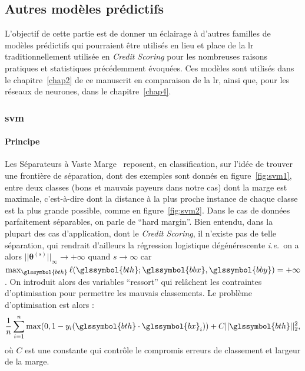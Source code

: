 \subsection{Autres modèles prédictifs}

L'objectif de cette partie est de donner un éclairage à d'autres familles de modèles prédictifs qui pourraient être utilisés en lieu et place de la \gls{lr} traditionnellement utilisée en \textit{Credit Scoring} pour les nombreuses raisons pratiques et statistiques précédemment évoquées. Ces modèles sont utilisés dans le chapitre~\ref{chap2} de ce manuscrit en comparaison de la \gls{lr}, ainsi que, pour les réseaux de neurones, dans le chapitre~\ref{chap4}.

\subsubsection{\Gls{svm}}

\paragraph{Principe}


Les Séparateurs à Vaste Marge~\cite{vapnik2013nature} reposent, en classification, sur l'idée de trouver une frontière de séparation, dont des exemples sont donnés en figure~\ref{fig:svm1}, entre deux classes (bons et mauvais payeurs dans notre cas) dont la marge est maximale, c'est-à-dire dont la distance à la plus proche instance de chaque classe est la plus grande possible, comme en figure~\ref{fig:svm2}. Dans le cas de données parfaitement séparables, on parle de ``hard margin''. Bien entendu, dans la plupart des cas d'application, dont le \textit{Credit Scoring}, il n'existe pas de telle séparation, qui rendrait d'ailleurs la régression logistique dégénérescente \textit{i.e.}\ on a alors $||\bm{\theta}^{(s)}||_{\infty} \to +\infty$ quand ${s \to \infty}$ car $\max_{\glssymbol{bth}} \ell(\glssymbol{bth};\glssymbol{bbx},\glssymbol{bby}) = + \infty$. On introduit alors des variables ``ressort'' qui relâchent les contraintes d'optimisation pour permettre les mauvais classements. Le problème d'optimisation est alors :
\begin{equation} \label{eq:svm}
\frac{1}{n} \sum_{i=1}^n \max(0,1 - y_i(\glssymbol{bth} \cdot \glssymbol{bx}_i)) + C ||\glssymbol{bth}||_2^2,
\end{equation}
où $C$ est une constante qui contrôle le compromis erreurs de classement et largeur de la marge.

